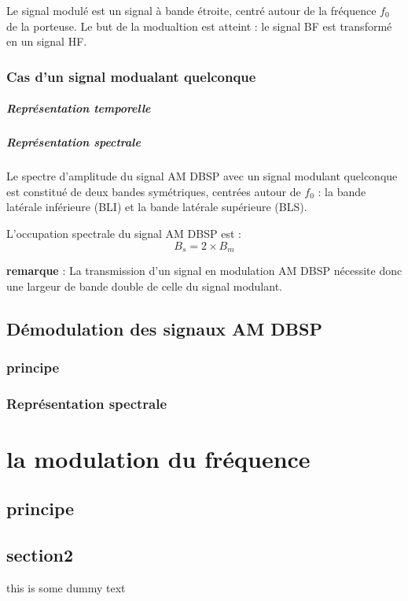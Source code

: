 \documentclass[12pt,a4paper,hidelinks,oneside]{book}
\begin{document}
Le signal modulé est un signal à bande étroite, centré autour de la fréquence $f_{0}$ de la porteuse. Le but
de la modualtion est atteint : le signal BF est transformé en un signal HF.

\subsection{Cas d’un signal modualant quelconque}
\paragraph{Représentation temporelle}
\paragraph{Représentation spectrale }
Le spectre d’amplitude du signal AM DBSP avec un signal modulant quelconque est constitué de deux
bandes symétriques, centrées autour de $f_{0}$ : la bande latérale inférieure (BLI) et la bande latérale
supérieure (BLS).

L’occupation spectrale du signal AM DBSP est :
\begin{equation}
B_{s}=2\times B_{m}
\end{equation}

\noindent\textbf{remarque} : La transmission d’un signal en modulation AM DBSP nécessite donc une largeur de bande double de
celle du signal modulant.

\section{Démodulation des signaux AM DBSP}
\subsection{principe}
\subsection{Représentation spectrale}


\chapter{la modulation du fréquence}
\section{principe}
\section{section2}

this is some dummy text 
\end{document}
